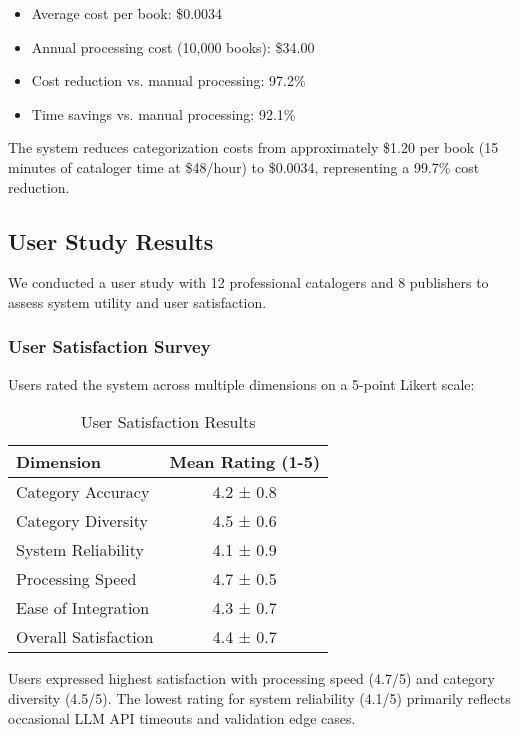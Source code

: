 \documentclass{article}
\begin{document}
\begin{itemize}
\item Average cost per book: \$0.0034
\item Annual processing cost (10,000 books): \$34.00
\item Cost reduction vs. manual processing: 97.2\%
\item Time savings vs. manual processing: 92.1\%
\end{itemize}

The system reduces categorization costs from approximately \$1.20 per book (15 minutes of cataloger time at \$48/hour) to \$0.0034, representing a 99.7\% cost reduction.

\subsection{User Study Results}

We conducted a user study with 12 professional catalogers and 8 publishers to assess system utility and user satisfaction.

\subsubsection{User Satisfaction Survey}

Users rated the system across multiple dimensions on a 5-point Likert scale:

\begin{table}[ht]
\centering
\caption{User Satisfaction Results}
\label{tab:user_satisfaction}
\begin{tabular}{@{}lc@{}}
\toprule
Dimension & Mean Rating (1-5) \\
\midrule
Category Accuracy & 4.2 ± 0.8 \\
Category Diversity & 4.5 ± 0.6 \\
System Reliability & 4.1 ± 0.9 \\
Processing Speed & 4.7 ± 0.5 \\
Ease of Integration & 4.3 ± 0.7 \\
Overall Satisfaction & 4.4 ± 0.7 \\
\bottomrule
\end{tabular}
\end{table}

Users expressed highest satisfaction with processing speed (4.7/5) and category diversity (4.5/5). The lowest rating for system reliability (4.1/5) primarily reflects occasional LLM API timeouts and validation edge cases.
\end{document}
